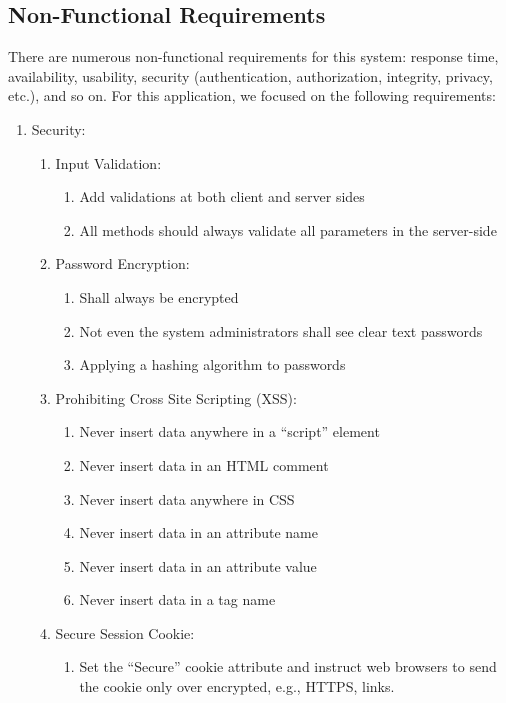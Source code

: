 \subsection{Non-Functional Requirements}
\label{sec:Requirements>Non-Functional Requirements}
There are numerous non-functional requirements for this system: response time, availability, usability, security (authentication, authorization, integrity, privacy, etc.), and so on. For this application, we focused on the following requirements:
\begin{enumerate}
  \item Security:
  \begin{enumerate}
    \item Input Validation:
    \begin{enumerate}
      \item Add validations at both client and server sides
      \item All methods should always validate all parameters in the server-side
    \end{enumerate}
    \item Password Encryption:
    \begin{enumerate}
      \item Shall always be encrypted
      \item Not even the system administrators shall see clear text passwords
      \item Applying a hashing algorithm to passwords
    \end{enumerate}
    \item Prohibiting Cross Site Scripting (XSS):
    \begin{enumerate}
      \item Never insert data anywhere in a ``script'' element
      \item Never insert data in an HTML comment
      \item Never insert data anywhere in CSS
      \item Never insert data in an attribute name
      \item Never insert data in an attribute value
      \item Never insert data in a tag name
    \end{enumerate}
    \item Secure Session Cookie:
    \begin{enumerate}
      \item Set the ``Secure'' cookie attribute and instruct web browsers to send the cookie only over encrypted, e.g., HTTPS, links.

\end{enumerate}
\end{enumerate}
\end{enumerate}
